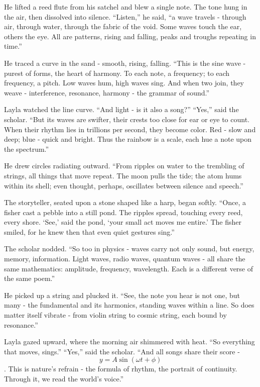 \documentclass[
  letterpaper,
  DIV=11,
  numbers=noendperiod]{scrreprt}
\begin{document}
He lifted a reed flute from his satchel and blew a single note. The tone
hung in the air, then dissolved into silence. ``Listen,'' he said, ``a
wave travels - through air, through water, through the fabric of the
void. Some waves touch the ear, others the eye. All are patterns, rising
and falling, peaks and troughs repeating in time.''

He traced a curve in the sand - smooth, rising, falling. ``This is the
sine wave - purest of forms, the heart of harmony. To each note, a
frequency; to each frequency, a pitch. Low waves hum, high waves sing.
And when two join, they weave - interference, resonance, harmony - the
grammar of sound.''

Layla watched the line curve. ``And light - is it also a song?''
``Yes,'' said the scholar. ``But its waves are swifter, their crests too
close for ear or eye to count. When their rhythm lies in trillions per
second, they become color. Red - slow and deep; blue - quick and bright.
Thus the rainbow is a scale, each hue a note upon the spectrum.''

He drew circles radiating outward. ``From ripples on water to the
trembling of strings, all things that move repeat. The moon pulls the
tide; the atom hums within its shell; even thought, perhaps, oscillates
between silence and speech.''

The storyteller, seated upon a stone shaped like a harp, began softly.
``Once, a fisher cast a pebble into a still pond. The ripples spread,
touching every reed, every shore. `See,' said the pond, `your small act
moves me entire.' The fisher smiled, for he knew then that even quiet
gestures sing.''

The scholar nodded. ``So too in physics - waves carry not only sound,
but energy, memory, information. Light waves, radio waves, quantum waves
- all share the same mathematics: amplitude, frequency, wavelength. Each
is a different verse of the same poem.''

He picked up a string and plucked it. ``See, the note you hear is not
one, but many - the fundamental and its harmonics, standing waves within
a line. So does matter itself vibrate - from violin string to cosmic
string, each bound by resonance.''

Layla gazed upward, where the morning air shimmered with heat. ``So
everything that moves, sings.'' ``Yes,'' said the scholar. ``And all
songs share their score - \[ y = A \sin(\omega t + \phi) \]. This is
nature's refrain - the formula of rhythm, the portrait of continuity.
Through it, we read the world's voice.''
\end{document}
